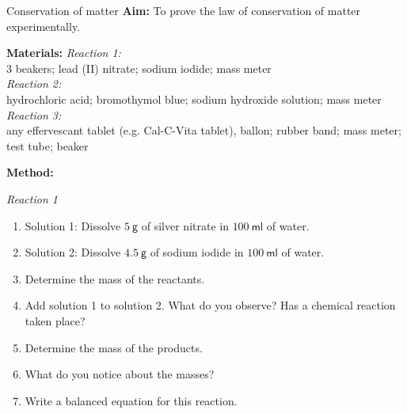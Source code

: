            \begin{i_experiment}{Conservation of matter}
            \nopagebreak
            \label{m38711*eip-453}\noindent{}\textbf{Aim:}
To prove the law of conservation of matter experimentally.
\par 
\label{m38711*eip792}\noindent{}\textbf{Materials:}
\textsl{Reaction 1:} \\
3 beakers; lead (II) nitrate; sodium iodide; mass meter \\
\textsl{Reaction 2:} \\
 hydrochloric acid; bromothymol blue; sodium hydroxide solution; mass meter \\
 \textsl{Reaction 3:} \\
any effervescant tablet (e.g. Cal-C-Vita tablet), ballon; rubber band; mass meter; test tube; beaker
\par 
\label{m38711*eip-153}
	\par
      \label{m38711*id72432}\noindent
\textbf{Method:} \\
\begin{minipage}{.6\textwidth}
\textsl{Reaction 1} 
\label{m38711*id6342}\begin{enumerate}[noitemsep, label=\textbf{\arabic*}. ] 
            \item Solution 1: Dissolve $5~\mathsf{g}$ of silver nitrate in $100~\mathsf{ml}$ of water.
\item Solution 2: Dissolve $4.5~\mathsf{g}$ of sodium iodide in $100~\mathsf{ml}$ of water.
\item Determine the mass of the reactants.
\item Add solution 1 to solution 2. What do you observe? Has a chemical reaction taken place? 
\item Determine the mass of the products. 
\item What do you notice about the masses?
\item Write a balanced equation for this reaction.
\end{enumerate}
\end{minipage}
\begin{minipage}{.4\textwidth}
 \begin{center}
\end{center}
\end{minipage}
\end{i_experiment}
